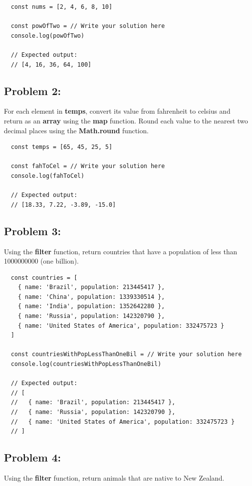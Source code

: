 \documentclass{article}
\begin{document}
\begin{verbatim}
  const nums = [2, 4, 6, 8, 10]

  const powOfTwo = // Write your solution here
  console.log(powOfTwo)

  // Expected output:
  // [4, 16, 36, 64, 100]
\end{verbatim}

\subsection*{Problem 2:} 
For each element in \textbf{temps}, convert its value from fahrenheit to celsius and return as an \textbf{array} using the \textbf{map} function. Round each value to the nearest two decimal places using the \textbf{Math.round} function.

\begin{verbatim}
  const temps = [65, 45, 25, 5]

  const fahToCel = // Write your solution here
  console.log(fahToCel)

  // Expected output:
  // [18.33, 7.22, -3.89, -15.0]
\end{verbatim}

\subsection*{Problem 3:} 
Using the \textbf{filter} function, return countries that have a population of less than 1000000000 (one billion).

\begin{verbatim}
  const countries = [
    { name: 'Brazil', population: 213445417 },
    { name: 'China', population: 1339330514 },
    { name: 'India', population: 1352642280 },
    { name: 'Russia', population: 142320790 },
    { name: 'United States of America', population: 332475723 }
  ]

  const countriesWithPopLessThanOneBil = // Write your solution here
  console.log(countriesWithPopLessThanOneBil)

  // Expected output:
  // [
  //   { name: 'Brazil', population: 213445417 }, 
  //   { name: 'Russia', population: 142320790 }, 
  //   { name: 'United States of America', population: 332475723 }
  // ]
\end{verbatim} 

\subsection*{Problem 4:} 
Using the \textbf{filter} function, return animals that are native to New Zealand.
\end{document}
